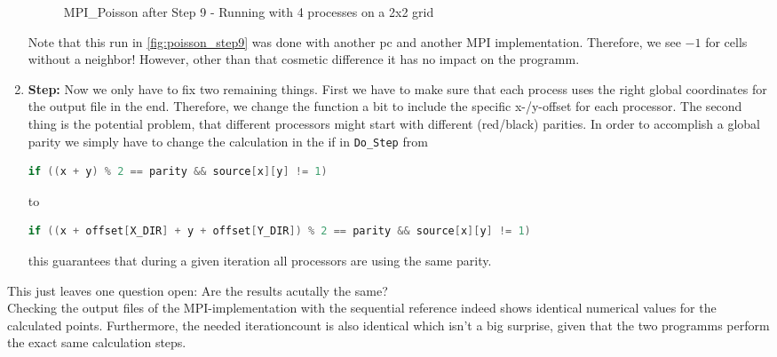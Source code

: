 \begin{enumerate}
\begin{figure}[H]
        \caption{MPI\_Poisson after Step 9 - Running with 4 processes on a 2x2 grid}
        \label{fig:poisson_step9}
    \end{figure}
    Note that this run in \autoref{fig:poisson_step9} was done with another pc and another MPI implementation. Therefore, we see $-1$ for cells without a neighbor! However, other than that cosmetic difference it has no impact on the programm. 
    \item \textbf{Step:} Now we only have to fix two remaining things. First we have to make sure that each process uses the right global coordinates for the output file in the end. Therefore, we change the function a bit to include the specific x-/y-offset for each processor. The second thing is the potential problem, that different processors might start with different (red/black) parities. In order to accomplish a global parity we simply have to change the calculation in the if in \texttt{Do\_Step} from 
    \begin{lstlisting}[language=c, lastline=1]
        if ((x + y) % 2 == parity && source[x][y] != 1)
    \end{lstlisting}
    to
    \begin{lstlisting}[language=c, lastline=1]
        if ((x + offset[X_DIR] + y + offset[Y_DIR]) % 2 == parity && source[x][y] != 1)
    \end{lstlisting}
    this guarantees that during a given iteration all processors are using the same parity. 
\end{enumerate}
This just leaves one question open: Are the results acutally the same?\\
Checking the output files of the MPI-implementation with the sequential reference indeed shows identical numerical values for the calculated points. Furthermore, the needed iterationcount is also identical which isn't a big surprise, given that the two programms perform the exact same calculation steps. 

